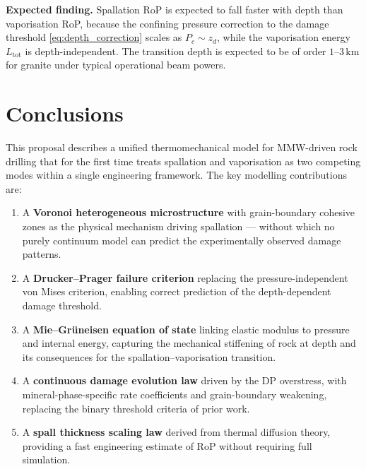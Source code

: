 \documentclass[12pt, a4paper]{article}
\begin{document}
\textbf{Expected finding.}  Spallation RoP is expected to fall faster with depth
than vaporisation RoP, because the confining pressure correction to the damage
threshold \cref{eq:depth_correction} scales as $P_c \sim z_d$, while the
vaporisation energy $L_\mathrm{tot}$ is depth-independent.  The transition depth
is expected to be of order $1$--$3\,\mathrm{km}$ for granite under typical
operational beam powers.

\section{Conclusions}
\label{sec:conclusions}

This proposal describes a unified thermomechanical model for MMW-driven rock
drilling that for the first time treats spallation and vaporisation as two
competing modes within a single engineering framework.  The key modelling
contributions are:

\begin{enumerate}[noitemsep]
    \item A \textbf{Voronoi heterogeneous microstructure} with grain-boundary
    cohesive zones as the physical mechanism driving spallation — without
    which no purely continuum model can predict the experimentally observed
    damage patterns.

    \item A \textbf{Drucker--Prager failure criterion} replacing the
    pressure-independent von Mises criterion, enabling correct prediction of
    the depth-dependent damage threshold.

    \item A \textbf{Mie--Gr\"{u}neisen equation of state} linking elastic
    modulus to pressure and internal energy, capturing the mechanical stiffening
    of rock at depth and its consequences for the spallation--vaporisation
    transition.

    \item A \textbf{continuous damage evolution law} driven by the DP overstress,
    with mineral-phase-specific rate coefficients and grain-boundary weakening,
    replacing the binary threshold criteria of prior work.

    \item A \textbf{spall thickness scaling law} derived from thermal diffusion
    theory, providing a fast engineering estimate of RoP without requiring full
    simulation.
\end{enumerate}
\end{document}
